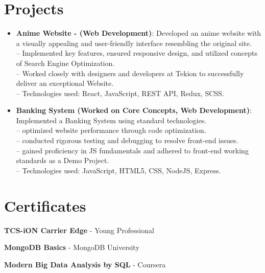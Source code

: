 \documentclass[a4paper,20pt]{article}
\newcommand{\resumeItem}[2]{
  \item\small{
    \textbf{#1}{: #2 \vspace{-2pt}}
  }
}
\newcommand{\resumeSubItem}[2]{\resumeItem{#1}{#2}\vspace{-3pt}}
\newcommand{\resumeSubHeadingListStart}{\begin{itemize}[leftmargin=*]}
\newcommand{\resumeSubHeadingListEnd}{\end{itemize}}
\begin{document}
\section{Projects}
\resumeSubHeadingListStart
\resumeSubItem{Anime Website - (Web Development)}{ Developed an anime website with a visually appealing and user-friendly interface resembling the original site.
\vspace{2pt}
\\ {--} Implemented key features, ensured responsive design, and utilized concepts of Search Engine Optimization. 
\vspace{2pt}
\\ {--} Worked closely with designers and developers at Tekion to successfully deliver an exceptional Website. 
\vspace{2pt}
\\ {--} Technologies used: React, JavaScript, REST API, Redux, SCSS.}
\vspace{5pt}
\resumeSubItem{ Banking System (Worked on Core Concepts, Web Development)}{Implemented a Banking System using standard technologies. 
\vspace{2pt}
\\ {--} optimized website performance through code optimization.
\vspace{2pt}
\\ {--} conducted rigorous testing and debugging to resolve front-end issues.
\vspace{2pt}
\\ {--} gained proficiency in JS fundamentals and adhered to front-end working standards as a Demo Project. 
\vspace{2pt}
\\ {--} Technologies used: JavaScript, HTML5, CSS, NodeJS, Express.}
\resumeSubHeadingListEnd
\vspace{4pt}

\section{Certificates}
\begin{description}[font=$\bullet$]
\item {\textbf{TCS-iON Carrier Edge} - Young Professional}
\vspace{-5pt}
\item {\textbf{MongoDB Basics} - MongoDB University }
\vspace{-5pt}
\item {\textbf{Modern Big Data Analysis by SQL} - Coursera}

\end{description}
\end{document}
